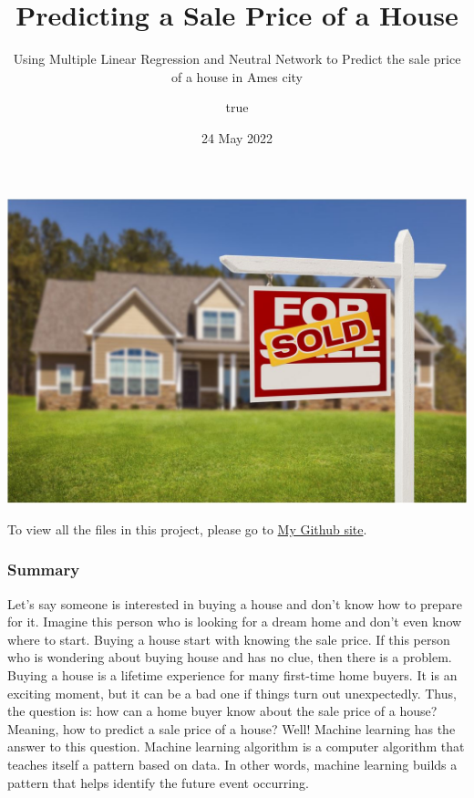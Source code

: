 \documentclass[
]{article}
\title{Predicting a Sale Price of a House}
\subtitle{Using Multiple Linear Regression and Neutral Network to
Predict the sale price of a house in Ames city}
\author{true}
\date{24 May 2022}
\begin{document}
\maketitle

\includegraphics[width=1\linewidth]{sale}

To view all the files in this project, please go to
\href{https://github.com/asmozo24/Machine_Learning_Final_Project}{My
Github site}.

\newpage

\centering
\raggedright
\newpage
\tableofcontents
\newpage

\hypertarget{summary}{%
\subsubsection{Summary}\label{summary}}

Let's say someone is interested in buying a house and don't know how to
prepare for it. Imagine this person who is looking for a dream home and
don't even know where to start. Buying a house start with knowing the
sale price. If this person who is wondering about buying house and has
no clue, then there is a problem. Buying a house is a lifetime
experience for many first-time home buyers. It is an exciting moment,
but it can be a bad one if things turn out unexpectedly. Thus, the
question is: how can a home buyer know about the sale price of a house?
Meaning, how to predict a sale price of a house? Well! Machine learning
has the answer to this question. Machine learning algorithm is a
computer algorithm that teaches itself a pattern based on data. In other
words, machine learning builds a pattern that helps identify the future
event occurring.
\end{document}
